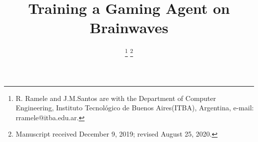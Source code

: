\documentclass[journal]{IEEEtran}
\begin{document}
%
\title{Training a Gaming Agent on Brainwaves}
%
%
%

\author{
%
  

\thanks{R. Ramele and J.M.Santos are with the Department
of Computer Engineering, Instituto Tecnológico de Buenos Aires(ITBA), Argentina,
e-mail: rramele@itba.edu.ar.}%
\thanks{Manuscript received December 9, 2019; revised August 25, 2020.}}

%
%
\end{document}
